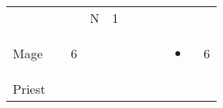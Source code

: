 \documentclass[12pt]{article}
\begin{document}
\begin{longtable}[]{@{}llllllllll@{}}
\begin{minipage}[t]{0.06\columnwidth}
\strut\end{minipage} &
\begin{minipage}[t]{0.06\columnwidth}\raggedright\strut
\strut\end{minipage} &
\begin{minipage}[t]{0.06\columnwidth}\raggedright\strut
\strut\end{minipage} &
\begin{minipage}[t]{0.07\columnwidth}\raggedright\strut
N
\strut\end{minipage} &
\begin{minipage}[t]{0.08\columnwidth}\raggedright\strut
1
\strut\end{minipage}\tabularnewline
\begin{minipage}[t]{0.13\columnwidth}\raggedright\strut
Mage
\strut\end{minipage} &
\begin{minipage}[t]{0.06\columnwidth}\raggedright\strut
\strut\end{minipage} &
\begin{minipage}[t]{0.06\columnwidth}\raggedright\strut
6
\strut\end{minipage} &
\begin{minipage}[t]{0.06\columnwidth}\raggedright\strut
\strut\end{minipage} &
\begin{minipage}[t]{0.06\columnwidth}\raggedright\strut
\strut\end{minipage} &
\begin{minipage}[t]{0.06\columnwidth}\raggedright\strut
\strut\end{minipage} &
\begin{minipage}[t]{0.06\columnwidth}\raggedright\strut
\strut\end{minipage} &
\begin{minipage}[t]{0.06\columnwidth}\raggedright\strut
\strut\end{minipage} &
\begin{minipage}[t]{0.07\columnwidth}\raggedright\strut
\begin{itemize}
\item
\end{itemize}
\strut\end{minipage} &
\begin{minipage}[t]{0.08\columnwidth}\raggedright\strut
6
\strut\end{minipage}\tabularnewline
\begin{minipage}[t]{0.13\columnwidth}\raggedright\strut
Priest
\strut\end{minipage} &

\end{longtable}
\end{document}
